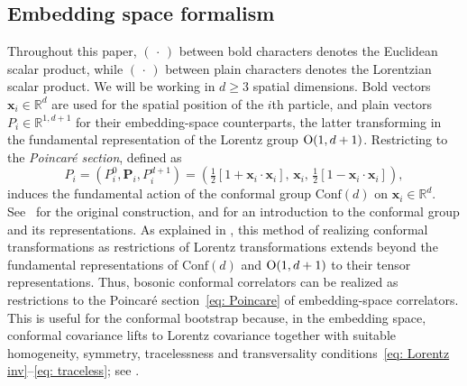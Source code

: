 \documentclass[12pt,a4paper]{extarticle}
\theoremstyle{definition}
\begin{document}
\subsection{Embedding space formalism}
Throughout this paper, $(\,\cdot\,)$ between bold characters denotes the Euclidean scalar product, while $(\,\cdot\,)$ between plain characters denotes the Lorentzian scalar product. We will be working in $d\ge 3$ spatial dimensions. Bold vectors $\mathbf{x}_i\in\mathbb{R}^d$ are used for the spatial position of the $i$th particle, and plain vectors $P_i\in\mathbb{R}^{1,d+1}$ for their embedding-space counterparts, the latter transforming in the fundamental representation of the Lorentz group ${\rm O}(1,d+1)$. Restricting to the \emph{Poincar\'e section}, defined as 
\begin{equation}\label{eq: Poincare}
P_i=(P_i^0,\mathbf{P}_i,P_i^{d+1})=\left(\tfrac{1}{2}[1+\mathbf{x}_i\cdot\mathbf{x}_i],\,\mathbf{x}_i,\,\tfrac{1}{2}[1-\mathbf{x}_i\cdot\mathbf{x}_i]\right),    
\end{equation}
induces the fundamental action of the conformal group $\mathrm{Conf}(d)$ on $\mathbf{x}_i\in\mathbb{R}^d$. See~\cite{Dirac} for the original construction, and \cite[Sections~4.1–4.2]{FMS} for an introduction to the conformal group and its representations. As explained in \cite{CPPR,FGG2,FGG,MackSalam,Weinberg}, this method of realizing conformal transformations as restrictions of Lorentz transformations extends beyond the fundamental representations of $\mathrm{Conf}(d)$ and ${\rm O}(1,d+1)$ to their tensor representations. 
Thus, bosonic conformal correlators can be realized as restrictions to the Poincar\'e section~\eqref{eq: Poincare} of embedding-space correlators. This is useful for the conformal bootstrap because, in the embedding space, conformal covariance lifts to Lorentz covariance together with suitable homogeneity, symmetry, tracelessness and transversality conditions~\eqref{eq: Lorentz inv}–\eqref{eq: traceless}; see \cite{FGG}.

\medskip
\end{document}

